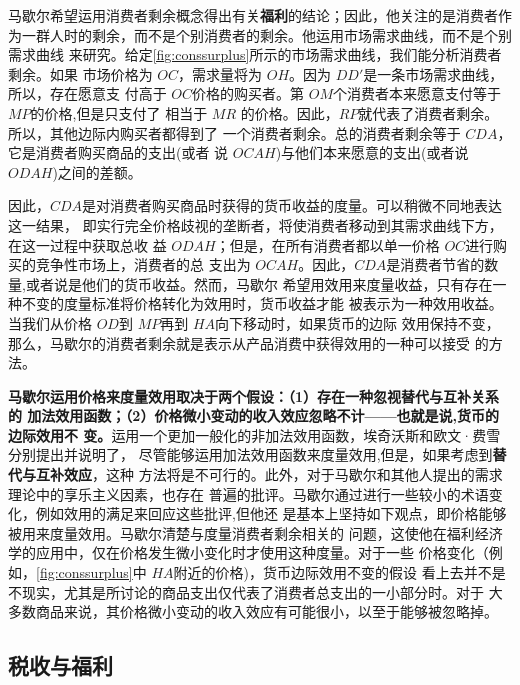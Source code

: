 马歇尔希望运用消费者剩余概念得出有关\textbf{福利}的结论；因此，他关注的是消费者作
为一群人时的剩余，而不是个别消费者的剩余。他运用市场需求曲线，而不是个别需求曲线
来研究。给定\cref{fig:conssurplus}所示的市场需求曲线，我们能分析消费者剩余。如果
市场价格为 $OC$，需求量将为 $OH$。因为 $DD'$是一条市场需求曲线，所以，存在愿意支
付高于 $OC$价格的购买者。第 $OM$个消费者本来愿意支付等于 $MP$的价格,但是只支付了
相当于 $MR$ 的价格。因此，$RP$就代表了消费者剩余。所以，其他边际内购买者都得到了
一个消费者剩余。总的消费者剩余等于 $CDA$，它是消费者购买商品的支出(或者
说 $OCAH$)与他们本来愿意的支出(或者说 $ODAH$)之间的差额。

因此，$CDA$是对消费者购买商品时获得的货币收益的度量。可以稍微不同地表达这一结果，
即实行完全价格歧视的垄断者，将使消费者移动到其需求曲线下方，在这一过程中获取总收
益 $ODAH$；但是，在所有消费者都以单一价格 $OC$进行购买的竞争性市场上，消费者的总
支出为 $OCAH$。因此，$CDA$是消费者节省的数量,或者说是他们的货币收益。然而，马歇尔
希望用效用来度量收益，只有存在一种不变的度量标准将价格转化为效用时，货币收益才能
被表示为一种效用收益。当我们从价格 $OD$到 $MP$再到 $HA$向下移动时，如果货币的边际
效用保持不变，那么，马歇尔的消费者剩余就是表示从产品消费中获得效用的一种可以接受
的方法。

\textbf{马歇尔运用价格来度量效用取决于两个假设：（1）存在一种忽视替代与互补关系的
  加法效用函数；（2）价格微小变动的收入效应忽略不计——也就是说,货币的边际效用不
  变。}运用一个更加一般化的非加法效用函数，埃奇沃斯和欧文·费雪分别提出并说明了，
尽管能够运用加法效用函数来度量效用,但是，如果考虑到\textbf{替代与互补效应}，这种
方法将是不可行的。此外，对于马歇尔和其他人提出的需求理论中的享乐主义因素，也存在
普遍的批评。马歇尔通过进行一些较小的术语变化，例如效用的满足来回应这些批评,但他还
是基本上坚持如下观点，即价格能够被用来度量效用。马歇尔清楚与度量消费者剩余相关的
问题，这使他在福利经济学的应用中，仅在价格发生微小变化时才使用这种度量。对于一些
价格变化（例如，\cref{fig:conssurplus}中 $HA$附近的价格)，货币边际效用不变的假设
看上去并不是不现实，尤其是所讨论的商品支出仅代表了消费者总支出的一小部分时。对于
大多数商品来说，其价格微小变动的收入效应有可能很小，以至于能够被忽略掉。

\subsection{税收与福利}

